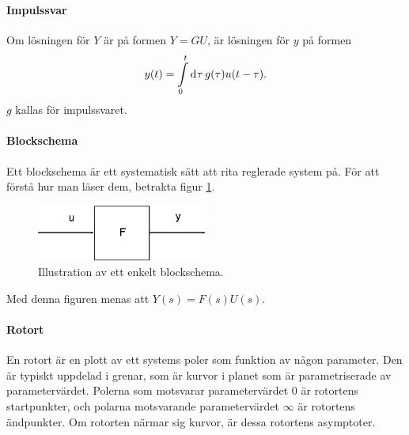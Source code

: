 \paragraph{Impulssvar}
Om lösningen för $Y$ är på formen $Y = GU$, är lösningen för $y$ på formen
\begin{align*}
	y(t) = \int\limits_{0}^{t}\dd[]{\tau}g(\tau)u(t - \tau).
\end{align*}
$g$ kallas för impulssvaret.

\paragraph{Blockschema}
Ett blockschema är ett systematisk sätt att rita reglerade system på. För att förstå hur man läser dem, betrakta figur \ref{fig:basic_block}.
\begin{figure}[!ht]
	\centering
	\includegraphics[width = 0.5\textwidth]{./Images/basic_block.eps}
	\caption{Illustration av ett enkelt blockschema.}
	\label{fig:basic_block}
\end{figure}

Med denna figuren menas att $Y(s) = F(s)U(s)$.

\paragraph{Rotort}
En rotort är en plott av ett systems poler som funktion av någon parameter. Den är typiskt uppdelad i grenar, som är kurvor i planet som är parametriserade av parametervärdet. Polerna som motsvarar parametervärdet $0$ är rotortens startpunkter, och polarna motsvarande parametervärdet $\infty$ är rotortens ändpunkter. Om rotorten närmar sig kurvor, är dessa rotortens asymptoter.